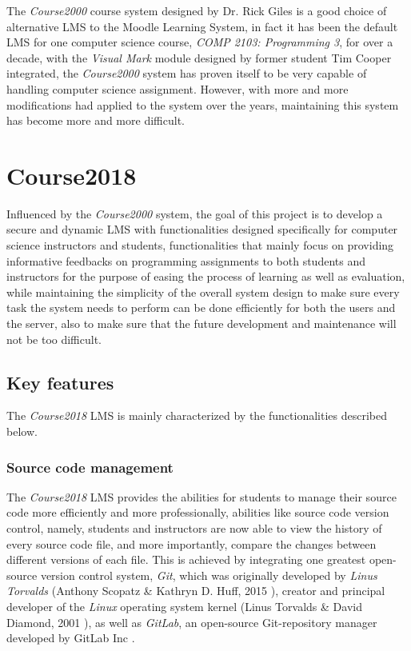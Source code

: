 \medskip

The \emph{Course2000} course system designed by Dr. Rick Giles is a good choice
of alternative LMS to the Moodle Learning System, in fact it has been the
default LMS for one computer science course, \emph{COMP 2103: Programming 3},
for over a decade, with the \emph{Visual Mark} module designed by former
student Tim Cooper integrated, the \emph{Course2000} system has proven itself
to be very capable of handling computer science assignment. However, with more
and more modifications had applied to the system over the years, maintaining
this system has become more and more difficult.

\section{Course2018}
Influenced by the \emph{Course2000} system, the goal of this project is to
develop a secure and dynamic LMS with functionalities designed specifically for
computer science instructors and students, functionalities that mainly focus on
providing informative feedbacks on programming assignments to both students
and instructors for the purpose of easing the process of learning as well as
evaluation, while maintaining the simplicity of
the overall system design to make sure every task the system needs to
perform can be done efficiently for both the users and the server, also to make
sure that the future development and maintenance will not be too difficult.

\subsection{Key features}
The \emph{Course2018} LMS is mainly characterized by the functionalities
described below.

\subsubsection{Source code management}
The \emph{Course2018} LMS provides the abilities for students to manage
their source code more efficiently and more professionally, abilities like 
source code version control, namely, students and instructors are now able
to view the history of every source code file, and more importantly, compare
the changes between different versions of each file.
This is achieved by integrating one greatest open-source version control system,
\emph{Git}, which was originally developed by \emph{Linus Torvalds} 
(Anthony Scopatz \& Kathryn D. Huff, 2015 \cite{git}),
creator and principal developer of the \emph{Linux} operating system kernel
(Linus Torvalds \& David Diamond, 2001 \cite{lTorvalds}), as well as 
\emph{GitLab}, an open-source Git-repository manager developed by GitLab Inc
\cite{gitlab}.

